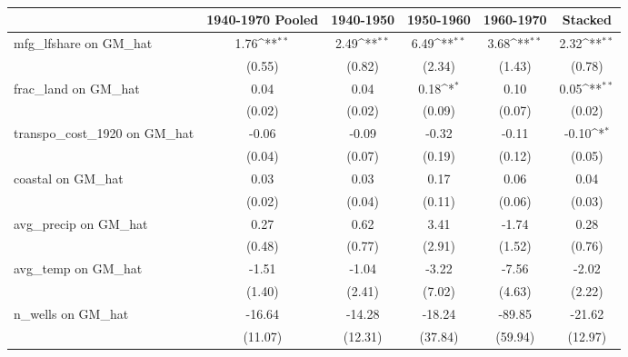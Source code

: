 \begin{table}[htbp]\centering
\def\sym#1{\ifmmode^{#1}\else\(^{#1}\)\fi}
\caption{}
\begin{tabular}{l*{5}{c}}
\toprule
                &\multicolumn{1}{c}{1940-1970 Pooled}&\multicolumn{1}{c}{1940-1950}&\multicolumn{1}{c}{1950-1960}&\multicolumn{1}{c}{1960-1970}&\multicolumn{1}{c}{Stacked}\\
\midrule
mfg\_lfshare on GM\_hat&     1.76\sym{**} &     2.49\sym{**} &     6.49\sym{**} &     3.68\sym{**} &     2.32\sym{**} \\
                &   (0.55)         &   (0.82)         &   (2.34)         &   (1.43)         &   (0.78)         \\
\addlinespace
frac\_land on GM\_hat&     0.04         &     0.04         &     0.18\sym{*}  &     0.10         &     0.05\sym{**} \\
                &   (0.02)         &   (0.02)         &   (0.09)         &   (0.07)         &   (0.02)         \\
\addlinespace
transpo\_cost\_1920 on GM\_hat&    -0.06         &    -0.09         &    -0.32         &    -0.11         &    -0.10\sym{*}  \\
                &   (0.04)         &   (0.07)         &   (0.19)         &   (0.12)         &   (0.05)         \\
\addlinespace
coastal on GM\_hat&     0.03         &     0.03         &     0.17         &     0.06         &     0.04         \\
                &   (0.02)         &   (0.04)         &   (0.11)         &   (0.06)         &   (0.03)         \\
\addlinespace
avg\_precip on GM\_hat&     0.27         &     0.62         &     3.41         &    -1.74         &     0.28         \\
                &   (0.48)         &   (0.77)         &   (2.91)         &   (1.52)         &   (0.76)         \\
\addlinespace
avg\_temp on GM\_hat&    -1.51         &    -1.04         &    -3.22         &    -7.56         &    -2.02         \\
                &   (1.40)         &   (2.41)         &   (7.02)         &   (4.63)         &   (2.22)         \\
\addlinespace
n\_wells on GM\_hat&   -16.64         &   -14.28         &   -18.24         &   -89.85         &   -21.62         \\
                &  (11.07)         &  (12.31)         &  (37.84)         &  (59.94)         &  (12.97)         \\

\end{tabular}
\end{table}
